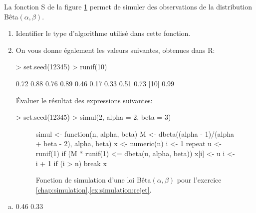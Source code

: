 \begin{exercice}
  \label{ex:simulation:rejet}
  La fonction S de la figure \ref{fig:simulation:fonction} permet de
  simuler des observations de la distribution Bêta$(\alpha, \beta)$.
  \begin{enumerate}
  \item Identifier le type d'algorithme utilisé dans cette fonction.
  \item On vous donne également les valeurs suivantes, obtenues dans
    \textsf{R}:
\begin{Schunk}
\begin{Sinput}
> set.seed(12345)
> runif(10)
\end{Sinput}
\begin{Soutput}
 [1] 0.72 0.88 0.76 0.89 0.46 0.17 0.33 0.51 0.73
[10] 0.99
\end{Soutput}
\end{Schunk}
    Évaluer le résultat des expressions suivantes:
\begin{Schunk}
\begin{Sinput}
> set.seed(12345)
> simul(2, alpha = 2, beta = 3)
\end{Sinput}
\end{Schunk}
    \begin{figure}[t]
      \begin{framed}
\begin{Scode}
simul <- function(n, alpha, beta)
{
    M <- dbeta((alpha - 1)/(alpha + beta - 2),
               alpha, beta)
    x <- numeric(n)
    i <- 1
    repeat
    {
        u <- runif(1)
        if (M * runif(1) <= dbeta(u, alpha, beta))
        {
            x[i] <- u
            i <- i + 1
        }
        if (i > n)
            break
    }
    x
}
\end{Scode}
      \end{framed}
      \caption{Fonction de simulation d'une loi Bêta$(\alpha, \beta)$
        pour l'exercice
        \ref{chap:simulation}.\ref{ex:simulation:rejet}.}
      \label{fig:simulation:fonction}
    \end{figure}
  \end{enumerate}
  \begin{rep}
    \begin{enumerate}[a)]
    \item
\begin{Schunk}
\begin{Soutput}
[1] 0.46 0.33
\end{Soutput}
\end{Schunk}

\end{enumerate}
\end{rep}
\end{exercice}
